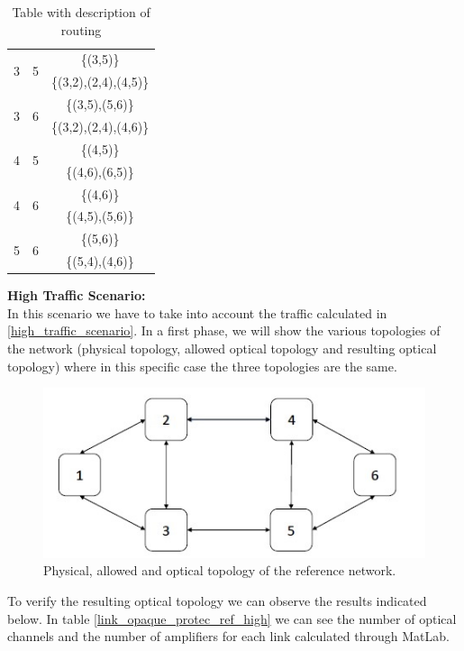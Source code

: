 \begin{table}[h!]
\begin{tabular}{|| c | c | c ||}
 \multirow{2}{*}{3} & \multirow{2}{*}{5} & \{(3,5)\}\\
 & & \{(3,2),(2,4),(4,5)\} \\ \hline
 \multirow{2}{*}{3} & \multirow{2}{*}{6} & \{(3,5),(5,6)\}\\
 & & \{(3,2),(2,4),(4,6)\} \\ \hline
 \multirow{2}{*}{4} & \multirow{2}{*}{5} & \{(4,5)\}\\
 & & \{(4,6),(6,5)\} \\ \hline
 \multirow{2}{*}{4} & \multirow{2}{*}{6} & \{(4,6)\}\\
 & & \{(4,5),(5,6)\} \\ \hline
 \multirow{2}{*}{5} & \multirow{2}{*}{6} & \{(5,6)\}\\
 & & \{(5,4),(4,6)\} \\
 \hline
\end{tabular}
\caption{Table with description of routing}
\label{path_opaque_protec_ref_medium}
\end{table}


\newpage
\textbf{High Traffic Scenario:}\\

In this scenario we have to take into account the traffic calculated in \ref{high_traffic_scenario}. In a first phase, we will show the various topologies of the network (physical topology, allowed optical topology and resulting optical topology) where in this specific case the three topologies are the same.\\

\begin{figure}[h!]
\centering
\includegraphics[width=13cm]{sdf/ilp/opaque_protection/figures/physical_opaque_protec_ref_low}
\caption{Physical, allowed and optical topology of the reference network.}
\label{physical_protec_ref_high}
\end{figure}

\vspace{13pt}
To verify the resulting optical topology we can observe the results indicated below. In table \ref{link_opaque_protec_ref_high} we can see the number of optical channels and the number of amplifiers for each link calculated through MatLab.\\

